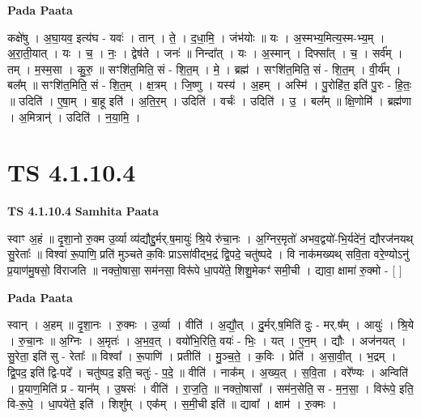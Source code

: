 \documentclass[17pt]{extarticle}
\begin{document}
\textbf{Pada Paata} \newline

कक्षे॑षु । अ॒घा॒यव॒ इत्य॑घ - यवः॑ । तान् । ते॒ । द॒धा॒मि॒ । जंभ॑योः ॥ यः । अ॒स्मभ्य॒मित्य॒स्म-भ्य॒म् । अ॒रा॒ती॒यात् । यः । च॒ । नः॒ । द्वेष॑ते । जनः॑ ॥ निन्दा᳚त् । यः । अ॒स्मान् । दिफ्सा᳚त् । च॒ । सर्व᳚म् । तम् । म॒स्म॒सा । कु॒रु॒ ॥ सꣳशि॑त॒मिति॒ सं - शि॒त॒म् । मे॒ । ब्रह्म॑ । सꣳशि॑त॒मिति॒ सं - शि॒त॒म् । वी॒र्य᳚म् । बल᳚म् ॥ सꣳशि॑त॒मिति॒ सं - शि॒त॒म् । क्ष॒त्रम् । जि॒ष्णु । यस्य॑ । अ॒हम् । अस्मि॑ । पु॒रोहि॑त॒ इति॑ पु॒रः - हि॒तः॒ ॥ उदिति॑ । ए॒षा॒म् । बा॒हू इति॑ । अ॒ति॒र॒म् । उदिति॑ । वर्चः॑ । उदिति॑ । उ॒ । बल᳚म् ॥ क्षि॒णोमि॑ । ब्रह्म॑णा । अ॒मित्रान्॑ । उदिति॑ । न॒या॒मि॒ ।  \newline




\section*{ TS 4.1.10.4 }

\textbf{TS 4.1.10.4 } \newline
\textbf{Samhita Paata} \newline

स्वाꣳ अ॒हं ॥ दृ॒शा॒नो रु॒क्म उ॒र्व्या व्य॑द्यौद्दु॒र्मर्.ष॒मायुः॑ श्रि॒ये रु॑चा॒नः । अ॒ग्निर॒मृतो॑ अभव॒द्वयो॑-भि॒र्यदे॑नं॒ द्यौरज॑नयथ् सु॒रेताः᳚ ॥ विश्वा॑ रू॒पाणि॒ प्रति॑ मुञ्चते क॒विः प्राऽसा॑वीद्भ॒द्रं द्वि॒पदे॒ चतु॑ष्पदे । वि नाक॑मख्यथ् सवि॒ता वरे॒ण्योऽनु॑ प्र॒याण॑मु॒षसो॒ वि॑राजति ॥ नक्तो॒षासा॒ सम॑नसा॒ विरू॑पे धा॒पये॑ते॒ शिशु॒मेकꣳ॑ समी॒ची । द्यावा॒ क्षामा॑ रु॒क्मो - [  ] \newline

\textbf{Pada Paata} \newline

स्वान् । अ॒हम् ॥ दृ॒शा॒नः । रु॒क्मः । उ॒र्व्या । वीति॑ । अ॒द्यौ॒त् । दु॒र्मर्.ष॒मिति॑ दुः - मर्.ष᳚म् । आयुः॑ । श्रि॒ये । रु॒चा॒नः ॥ अ॒ग्निः । अ॒मृतः॑ । अ॒भ॒व॒त् । वयो॑भि॒रिति॒ वयः॑ - भिः॒ । यत् । ए॒न॒म् । द्यौः । अज॑नयत् । सु॒रेता॒ इति॑ सु - रेताः᳚ ॥ विश्वा᳚ । रू॒पाणि॑ । प्रतीति॑ । मु॒ञ्च॒ते॒ । क॒विः । प्रेति॑ । अ॒सा॒वी॒त् । भ॒द्रम् । द्वि॒पद॒ इति॑ द्वि-पदे᳚ । चतु॑ष्पद॒ इति॒ चतुः॑ - प॒दे॒ ॥ वीति॑ । नाक᳚म् । अ॒ख्य॒त् । स॒वि॒ता । वरे᳚ण्यः । अन्विति॑ । प्र॒याण॒मिति॑ प्र - यान᳚म् । उ॒षसः॑ । वीति॑ । रा॒ज॒ति॒ ॥ नक्तो॒षासा᳚ । सम॑न॒सेति॒ स - म॒न॒सा॒ । विरू॑पे॒ इति॒ वि-रू॒पे॒ । धा॒पये॑ते॒ इति॑ । शिशु᳚म् । एक᳚म् । स॒मी॒ची इति॑ ॥ द्यावा᳚ । क्षाम॑ । रु॒क्मः ।  \newline
\end{document}
